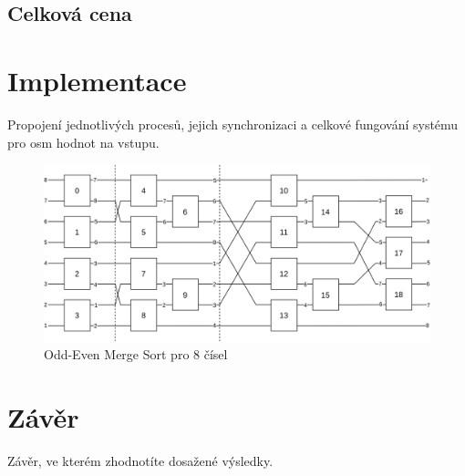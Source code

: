 \documentclass[12pt,a4paper]{article}
\begin{document}
\subsection*{Celková cena}
\label{sub:celkova_cena}


\section{Implementace}
\label{sec:implementace}
Propojení jednotlivých procesů, jejich synchronizaci a celkové fungování systému pro osm hodnot na vstupu.



\begin{figure}[H]
    \centering
    \includegraphics[width=\textwidth]{img/oems.png}
    \caption{Odd-Even Merge Sort pro 8 čísel}
    \label{fig:oems}
\end{figure}

\section{Závěr}
\label{sec:závěr}
Závěr, ve kterém zhodnotíte dosažené výsledky.
\end{document}
